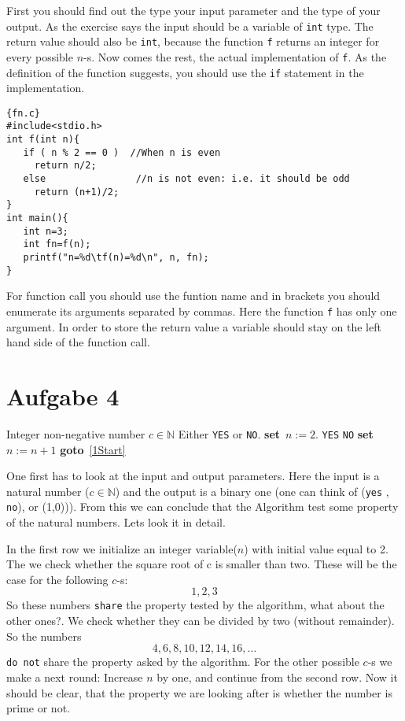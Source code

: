 \documentclass{article}[12pt]
\newcommand{\SET}{\textbf{set}\ }
\newcommand{\GOTO}{\textbf{goto}\ }
\begin{document}
First you should find out the type your input parameter and the type of your output. As the exercise says
the input should be a variable of \texttt{int} type. The return value should also be \texttt{int}, because
the function \texttt{f} returns an integer for every possible $n$-s. Now comes the rest, the actual
implementation of \texttt{f}. As the definition of the function suggests, you should use the \texttt{if} 
statement in the implementation.
\begin{lstlisting}{fn.c}
#include<stdio.h>
int f(int n){
   if ( n % 2 == 0 )  //When n is even
     return n/2;
   else                //n is not even: i.e. it should be odd
     return (n+1)/2;
}
int main(){
   int n=3;
   int fn=f(n);
   printf("n=%d\tf(n)=%d\n", n, fn);
}
\end{lstlisting}
For function call you should use the funtion name and in brackets you should enumerate its
arguments separated by commas. Here the function \texttt{f} has only one argument. In order
to store the return value a variable should stay on the left hand side of the function call. 
\section{Aufgabe 4}
\begin{algorithm}[H]
\caption{}
\begin{algorithmic}[1]
\REQUIRE Integer non-negative number $c\in\mathbb{N}$
\ENSURE Either \verb|YES| or \verb|NO|.
\STATE \SET $n := 2$.
 \label{1Start}
\RETURN \verb|YES|
\ENDIF
{}
\RETURN \verb|NO|
\ENDIF
\STATE \SET $n := n + 1$
\STATE \GOTO \ref{1Start}
\end{algorithmic}
\end{algorithm}
One first has to look at the input and output parameters. Here the input is a natural number ($c\in\mathbb{N}$) and the output is a 
binary one (one can think of (\texttt{yes} , \texttt{no}), or (1,0))). From this we can conclude that the Algorithm test some property 
of the natural numbers. Lets look it in detail.  

In the first row we initialize an integer variable($n$) with initial value equal to 2. The we check whether the square root of c is smaller
than two. These will be the case for the following $c$-s:
\begin{equation}
1,2,3
\end{equation}
So these numbers \texttt{share} the property tested by the algorithm, what about the other ones?. We check whether they can be divided by two (without 
remainder). So the numbers
\begin{equation}
4,6,8,10,12,14,16,\ldots
\end{equation}
\texttt{do not} share the property asked by the algorithm. For the other possible $c$-s we make a next round: Increase $n$ by one, and continue from 
the second row. Now it should be clear, that the property we are looking after is whether the number is prime or not. 
\end{document}
